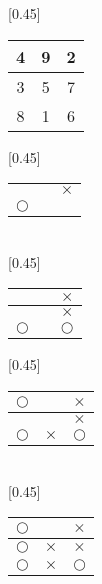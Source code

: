 \documentclass[UTF8]{article}
\begin{document}
\begin{figure}[htbp]
 \centering
 [0.45\linewidth]{
   \begin{tabular}{|c|c|c|}
   \hline
   4 & 9 & 2 \\
   \hline
   3 & 5 & 7 \\
   \hline
   8 & 1 & 6 \\
   \hline
   \end{tabular}
   \vspace{3mm}
 }
 [0.45\linewidth]{
   \begin{tabular}{c|c|c}
   &  & \\
   \hline
   &  & $\times$ \\
   \hline
   $\bigcirc$ & & \\
   \end{tabular}
   \vspace{3mm}
 } \vspace{3mm} \\
 [0.45\linewidth]{
   \begin{tabular}{c|c|c}
   &  & $\times$\\
   \hline
   &  & $\times$ \\
   \hline
   $\bigcirc$ & & $\bigcirc$ \\
   \end{tabular}
   \vspace{3mm}
 }
 [0.45\linewidth]{
   \begin{tabular}{c|c|c}
   $\bigcirc$ &  & $\times$\\
   \hline
   &  & $\times$ \\
   \hline
   $\bigcirc$ & $\times$ & $\bigcirc$ \\
   \end{tabular}
   \vspace{3mm}
 } \vspace{3mm} \\
 [0.45\linewidth]{
   \begin{tabular}{c|c|c}
   $\pmb{\bigcirc}$ &  & $\times$\\
   \hline
   $\pmb{\bigcirc}$ &  $\times$ & $\times$ \\
   \hline
   $\pmb{\bigcirc}$ & $\times$ & $\bigcirc$ \\
   \end{tabular}
   \vspace{3mm}
 }
 \captionsetup{labelformat=empty}
 \caption{}
 \label{fig:game-steps}
\end{figure}
\end{document}
